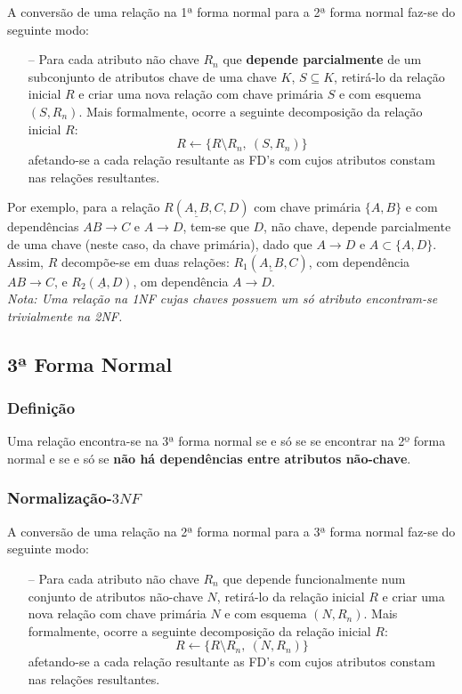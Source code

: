 \documentclass[oneside]{book}
\theoremstyle{definition}
\begin{document}
A conversão de uma relação na 1ª forma normal para a 2ª forma normal faz-se do seguinte modo:

\begin{itemize}
    \item[--] Para cada atributo não chave $R_n$ que \textbf{depende parcialmente} de um subconjunto de atributos chave de uma chave $K$, $S \subseteq K$, retirá-lo da relação inicial $R$ e criar uma nova relação com chave primária $S$ e com esquema $(S, R_n)$. Mais formalmente, ocorre a seguinte decomposição da relação inicial $R$: 
    \[
        R \gets \{R \setminus R_n,\:  (S, R_n)\}
    \]
    afetando-se a cada relação resultante as FD's com cujos atributos constam nas relações resultantes.
\end{itemize}

Por exemplo, para a relação $R(\underline{A, B}, C, D)$ com chave primária $\{A, B\}$ e com dependências $AB \rightarrow C$ e $A \rightarrow D$, tem-se que $D$, não chave, depende parcialmente de uma chave (neste caso, da chave primária), dado que $A \rightarrow D$ e $A \subset \{A, D\}$. Assim, $R$ decompõe-se em duas relações: $R_1(\underline{A, B}, C)$, com dependência $AB \rightarrow C$, e $R_2(\underline{A}, D)$, om dependência $A \rightarrow D$.\\ 
\vspace*{0.3em}
\textit{Nota: Uma relação na 1NF cujas chaves possuem um só atributo encontram-se trivialmente na 2NF.}

\subsection{3ª Forma Normal}

\subsubsection*{Definição}

Uma relação encontra-se na 3ª forma normal se e só se se encontrar na 2º forma normal e se e só se \textbf{não há dependências entre atributos não-chave}.

\subsubsection*{Normalização-$3NF$}

A conversão de uma relação na 2ª forma normal para a 3ª forma normal faz-se do seguinte modo:

\begin{itemize}
    \item[--] Para cada atributo não chave $R_n$ que depende funcionalmente num conjunto de atributos não-chave $N$, retirá-lo da relação inicial $R$ e criar uma nova relação com chave primária $N$ e com esquema $(N, R_n)$. Mais formalmente, ocorre a seguinte decomposição da relação inicial $R$: 
    \[
        R \gets \{R \setminus R_n,\:  (N, R_n)\}
    \]
    afetando-se a cada relação resultante as FD's com cujos atributos constam nas relações resultantes.
\end{itemize}
\end{document}
